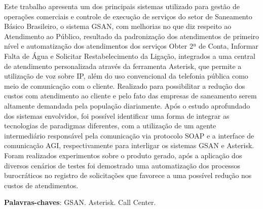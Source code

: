 \setlength{\absparsep}{18pt} %
\begin{resumo}
 
Este trabalho apresenta um dos principais sistemas utilizado para gestão de operações comerciais e controle de execução de serviços do setor de Saneamento Básico Brasileiro, o sistema GSAN, com melhorias no que diz respeito ao Atendimento ao Público, resultado da padronização dos atendimentos de primeiro nível e automatização dos atendimentos dos serviços Obter 2ª de Conta, Informar Falta de Água e Solicitar Restabelecimento da Ligação, integrados a uma central de atendimento personalizada através da ferramenta Asterisk, que permite a utilização de voz sobre IP, além do uso convencional da telefonia pública como meio de comunicação com o cliente. Realizado para possibilitar a redução dos custos com atendimento ao cliente e pelo fato das empresas de saneamento serem altamente demandada pela população diariamente. Após o estudo aprofundado dos sistemas envolvidos, foi possível identificar uma forma de integrar as tecnologias de paradigmas diferentes, com a utilização de um agente intermediário responsável pela comunicação via protocolo SOAP e a interface de comunicação AGI, respectivamente para interligar os sistemas GSAN e Asterisk.  Foram realizados experimentos sobre o produto gerado, após a aplicação dos diversos cenários de testes foi demostrado uma automatização dos processos burocráticos no registro de solicitações que favorece a uma possível redução nos custos de atendimentos.


 \textbf{Palavras-chaves}: GSAN. Asterisk. Call Center.
\end{resumo}